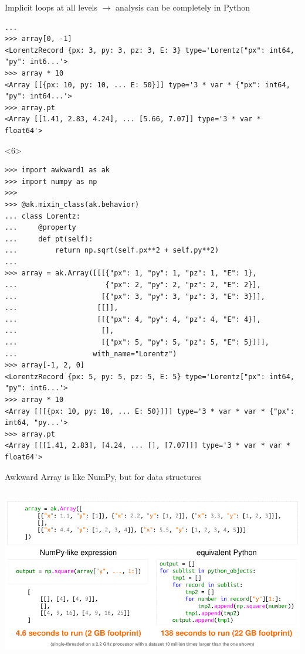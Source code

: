 \documentclass[aspectratio=169]{beamer}
\begin{document}
\begin{frame}[fragile]{Implicit loops at all levels $\to$ analysis can be completely in Python}
\begin{onlyenv}
\begin{verbatim}
... 
>>> array[0, -1]
<LorentzRecord {px: 3, py: 3, pz: 3, E: 3} type='Lorentz["px": int64, "py": int6...'>
>>> array * 10
<Array [[{px: 10, py: 10, ... E: 50}]] type='3 * var * {"px": int64, "py": int64...'>
>>> array.pt
<Array [[1.41, 2.83, 4.24], ... [5.66, 7.07]] type='3 * var * float64'>
\end{verbatim}
\vspace{3 cm}
\end{onlyenv}
\begin{onlyenv}<6>
\begin{verbatim}
>>> import awkward1 as ak
>>> import numpy as np
>>> 
>>> @ak.mixin_class(ak.behavior)
... class Lorentz:
...     @property
...     def pt(self):
...         return np.sqrt(self.px**2 + self.py**2)
... 
>>> array = ak.Array([[[{"px": 1, "py": 1, "pz": 1, "E": 1},
...                     {"px": 2, "py": 2, "pz": 2, "E": 2}],
...                    [{"px": 3, "py": 3, "pz": 3, "E": 3}]],
...                   [[]],
...                   [[{"px": 4, "py": 4, "pz": 4, "E": 4}],
...                    [],
...                    [{"px": 5, "py": 5, "pz": 5, "E": 5}]]],
...                  with_name="Lorentz")
>>> array[-1, 2, 0]
<LorentzRecord {px: 5, py: 5, pz: 5, E: 5} type='Lorentz["px": int64, "py": int6...'>
>>> array * 10
<Array [[[{px: 10, py: 10, ... E: 50}]]] type='3 * var * var * {"px": int64, "py...'>
>>> array.pt
<Array [[[1.41, 2.83], [4.24, ... [], [7.07]]] type='3 * var * var * float64'>
\end{verbatim}
\vspace{3 cm}
\end{onlyenv}
\end{frame}

\begin{frame}{Awkward Array is like NumPy, but for data structures}
\vspace{0.2 cm}
\begin{columns}
\includegraphics[width=\linewidth]{img/pivarski-one-slide-summary.pdf}
\end{columns}
\end{frame}
\end{document}
